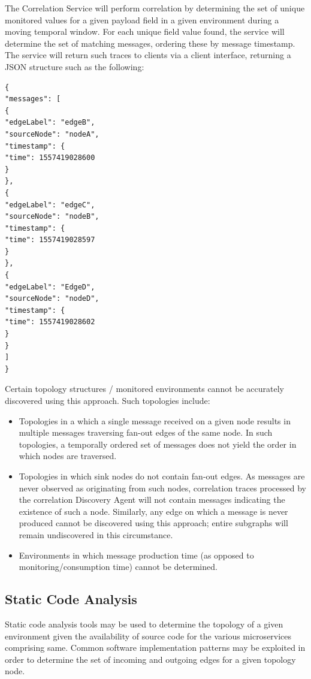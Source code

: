 The Correlation Service will perform correlation by determining the set of unique monitored values for a given payload field in a given environment during a moving temporal window. For each unique field value found, the service will determine the set of matching messages, ordering these by message timestamp. The service will return such traces to clients via a client interface, returning a JSON structure such as the following:

\begin{lstlisting}[caption={Correlation Service Message Trace}]
{
"messages": [
{
"edgeLabel": "edgeB",
"sourceNode": "nodeA",
"timestamp": {
"time": 1557419028600
}
},
{
"edgeLabel": "edgeC",
"sourceNode": "nodeB",
"timestamp": {
"time": 1557419028597
}
},    
{
"edgeLabel": "EdgeD",
"sourceNode": "nodeD",
"timestamp": {
"time": 1557419028602
}
}
]
}

\end{lstlisting}

Certain topology structures / monitored environments cannot be accurately discovered using this approach. Such topologies include:

\begin{itemize}
	\item Topologies in a which a single message received on a given node results in multiple messages traversing fan-out edges of the same node. In such topologies, a temporally ordered set of messages does not yield the order in which nodes are traversed.
	\item Topologies in which sink nodes do not contain fan-out edges. As messages are never observed as originating from such nodes, correlation traces processed by the correlation Discovery Agent will not contain messages indicating the existence of such a node. Similarly, any edge on which a message is never produced cannot be discovered using this approach; entire subgraphs will remain undiscovered in this circumstance.
	\item Environments in which message production time (as opposed to monitoring/consumption time) cannot be determined.  
	
\end{itemize}


\subsection{Static Code Analysis}

Static code analysis tools may be used to determine the topology of a given environment given the availability of source code for the various microservices comprising same. Common software implementation patterns may be exploited in order to determine the set of incoming and outgoing edges for a given topology node. 

